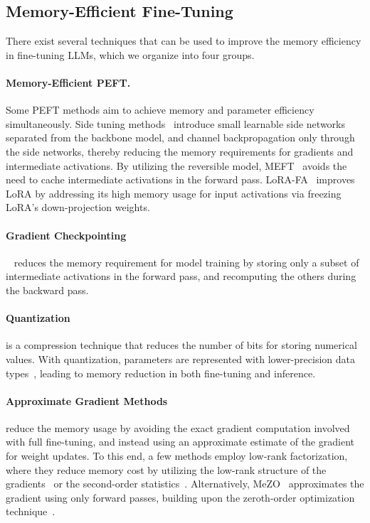 \subsection{Memory-Efficient Fine-Tuning}

There exist several techniques that can be used to improve the memory efficiency in fine-tuning LLMs,
which we organize into four groups.


\paragraph{Memory-Efficient PEFT.}
Some PEFT methods aim to achieve memory and parameter efficiency simultaneously.
Side tuning methods~\citep{zhang_20, sung2022lst}
introduce small learnable side networks separated from the backbone model, and
channel backpropagation only through the side networks, 
thereby reducing the memory requirements for gradients and intermediate activations.
By utilizing the reversible model, 
MEFT~\cite{DBLP:conf/nips/LiaoTM23} avoids the need to cache intermediate activations in the forward pass.
LoRA-FA~\citep{DBLP:journals/corr/abs-2308-03303} improves LoRA
by addressing its high memory usage for input activations
via freezing LoRA's down-projection weights.


\paragraph{Gradient Checkpointing}~\citep{DBLP:journals/corr/ChenXZG16,DBLP:conf/nips/GruslysMDLG16}
reduces the memory requirement for model training
by storing only a subset of intermediate activations in the forward pass, and recomputing the others during the backward pass.



\paragraph{Quantization} is a compression technique that reduces the number of bits for storing numerical values. 
With quantization, parameters are represented with lower-precision data types~\citep{dettmers_22, dettmers_23, liu_23},
leading to memory reduction in both fine-tuning and inference.

\paragraph{Approximate Gradient Methods} reduce the memory usage
by avoiding the exact gradient computation involved with full fine-tuning, and 
instead using an approximate estimate of the gradient for weight updates.
To this end, a few methods employ low-rank factorization,
where they reduce memory cost by utilizing 
the low-rank structure of the gradients~\citep{zhao2024galore} or the second-order statistics~\citep{DBLP:conf/icml/ShazeerS18}. Alternatively, MeZO~\citep{DBLP:conf/nips/MalladiGNDL0A23} 
approximates the gradient using only forward passes,
building upon the zeroth-order optimization technique~\cite{Spall1992MultivariateSA}.



